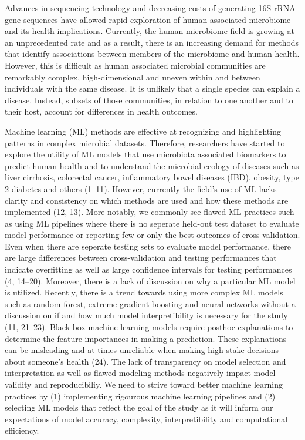 \documentclass[11pt,]{article}
\begin{document}
Advances in sequencing technology and decreasing costs of generating 16S
rRNA gene sequences have allowed rapid exploration of human associated
microbiome and its health implications. Currently, the human microbiome
field is growing at an unprecedented rate and as a result, there is an
increasing demand for methods that identify associations between members
of the microbiome and human health. However, this is difficult as human
associated microbial communities are remarkably complex,
high-dimensional and uneven within and between individuals with the same
disease. It is unlikely that a single species can explain a disease.
Instead, subsets of those communities, in relation to one another and to
their host, account for differences in health outcomes.

Machine learning (ML) methods are effective at recognizing and
highlighting patterns in complex microbial datasets. Therefore,
researchers have started to explore the utility of ML models that use
microbiota associated biomarkers to predict human health and to
understand the microbial ecology of diseases such as liver cirrhosis,
colorectal cancer, inflammatory bowel diseases (IBD), obesity, type 2
diabetes and others (1--11). However, currently the field's use of ML
lacks clarity and consistency on which methods are used and how these
methods are implemented (12, 13). More notably, we commonly see flawed
ML practices such as using ML pipelines where there is no seperate
held-out test dataset to evaluate model performance or reporting few or
only the best outcomes of cross-validation. Even when there are seperate
testing sets to evaluate model performance, there are large differences
between cross-validation and testing performances that indicate
overfitting as well as large confidence intervals for testing
performances (4, 14--20). Moreover, there is a lack of discussion on why
a particular ML model is utilized. Recently, there is a trend towards
using more complex ML models such as random forest, extreme gradient
boosting and neural networks without a discussion on if and how much
model interpretibility is necessary for the study (11, 21--23). Black
box machine learning models require posthoc explanations to determine
the feature importances in making a prediction. These explanations can
be misleading and at times unreliable when making high-stake decisions
about someone's health (24). The lack of transparency on model selection
and interpretation as well as flawed modeling methods negatively impact
model validity and reproducibiliy. We need to strive toward better
machine learning practices by (1) implementing rigourous machine
learning pipelines and (2) selecting ML models that reflect the goal of
the study as it will inform our expectations of model accuracy,
complexity, interpretibility and computational efficiency.
\end{document}
